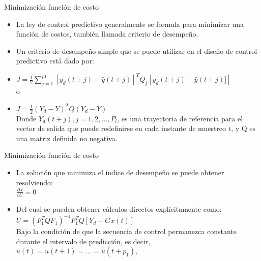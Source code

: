 \documentclass{beamer}
\begin{document}
\begin{frame}{Minimización función de costo}
\begin{justify}
\vspace{0.3cm}
\begin{itemize}
\item La ley de control predictivo generalmente se formula para minimizar una función de costos, también llamada criterio de desempeño.
\item Un criterio de desempeño simple que se puede utilizar en el diseño de control predictivo está dado por:
\\
\centering
\item $J=\frac{1}{2}\sum_{j=1}^{p1}\left [ y_d (t+j)-\hat{y}(t+j)\right ]^TQ_j\left [ y_d(t+j)-\hat{y}(t+j)] \right ]$
\\
o
\\
\item $J=\frac{1}{2}(Y_d-Y)^T Q(Y_d-Y)$
\\
\hfill \break
\justifying
Donde $Y_d(t + j), j = 1,2, ...,P_l$, es una trayectoria de referencia para el vector de salida que puede redefinirse en cada instante de muestreo t, y Q es una matriz definida no negativa.
\end{itemize}
\end{justify}
\end{frame}

\begin{frame}{Minimización función de costo}
\begin{justify}
\vspace{0.3cm}
\begin{itemize}
\item La solución que minimiza el índice de desempeño se puede obtener resolviendo:
\\
\centering
$\frac{\partial J}{\partial U}=0$
\item Del cual se pueden obtener cálculos directos explícitamente como:
\\
\hfill \break
$U=(F_1^TQF_1)^{-1}F_1^{T}Q[Y_d-Gx(t)]$
\\
\hfill \break
\justifying
Bajo la condición de que la secuencia de control permanezca constante durante el intervalo de predicción, es decir,
$u(t)=u(t+1)=...=u(t+p_1),$
\end{itemize}
\end{justify}
\end{frame}
\end{document}
